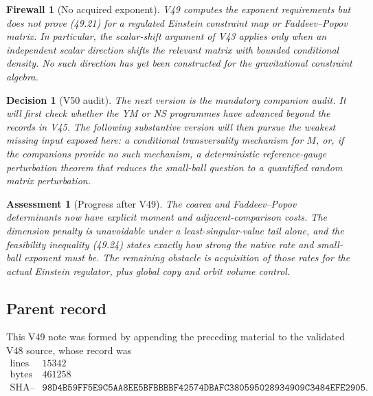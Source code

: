 \documentclass[11pt]{article}
\newtheorem{assessment}[theorem]{Assessment}
\newtheorem{firewall}[theorem]{Firewall}
\newtheorem{decision}[theorem]{Decision}
\begin{document}
\begin{firewall}[No acquired exponent]
\label{fire:v11v49-no-exponent}
V49 computes the exponent requirements but does not prove (49.21) for
a regulated Einstein constraint map or Faddeev--Popov matrix.  In
particular, the scalar-shift argument of V43 applies only when an
independent scalar direction shifts the relevant matrix with bounded
conditional density.  No such direction has yet been constructed for
the gravitational constraint algebra.
\end{firewall}

\begin{decision}[V50 audit]
\label{dec:v11v49-next}
The next version is the mandatory companion audit.  It will first
check whether the YM or NS programmes have advanced beyond the records
in V45.  The following substantive version will then pursue the
weakest missing input exposed here: a conditional transversality
mechanism for \(M\), or, if the companions provide no such mechanism,
a deterministic reference-gauge perturbation theorem that reduces the
small-ball question to a quantified random matrix perturbation.
\end{decision}

\begin{assessment}[Progress after V49]
\label{ass:v11v49-status}
The coarea and Faddeev--Popov determinants now have explicit moment and
adjacent-comparison costs.  The dimension penalty is unavoidable under
a least-singular-value tail alone, and the feasibility inequality
(49.24) states exactly how strong the native rate and small-ball
exponent must be.  The remaining obstacle is acquisition of those
rates for the actual Einstein regulator, plus global copy and orbit
volume control.
\end{assessment}

\subsection{Parent record}

This V49 note was formed by appending the preceding material to the
validated V48 source, whose record was
\[
\begin{array}{c|c}
\text{lines}&15342\\
\text{bytes}&461258\\
\text{SHA--256}&
\texttt{98D4B59FF5E9C5AA8EE5BFBBBBF42574DBAFC380595028934909C3484EFE2905}.
\end{array}                                                     \tag{49.28}
\]
\end{document}

